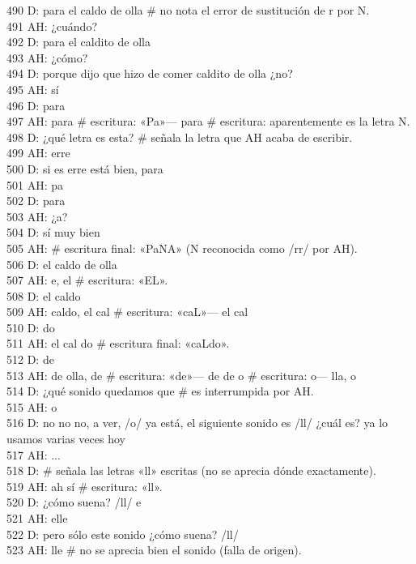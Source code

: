 490 D: para el caldo de olla \# no nota el error de sustitución de r por N.\\
491 AH: ¿cuándo?\\
492 D: para el caldito de olla\\
493 AH: ¿cómo?\\
494 D: porque dijo que hizo de comer caldito de olla ¿no?\\
495 AH: sí\\
496 D: para\\
497 AH: para \# escritura: «Pa»--- para \# escritura: aparentemente es la letra N.\\
498 D: ¿qué letra es esta? \# señala la letra que AH acaba de escribir.\\
499 AH: erre\\
500 D: si es erre está bien, para\\
501 AH: pa\\
502 D: para\\
503 AH: ¿a?\\
504 D: sí muy bien\\
505 AH: \# escritura final: «PaNA» (N reconocida como /rr/ por AH).\\
506 D: el caldo de olla\\
507 AH: e,  el \# escritura: «EL».\\
508 D: el caldo\\
509 AH: caldo, el cal \# escritura: «caL»--- el cal\\
510 D: do\\
511 AH: el cal do \# escritura final: «caLdo».\\
512 D: de\\
513 AH: de olla, de \# escritura: «de»--- de de o \#  escritura: o--- lla, o\\
514 D: ¿qué sonido quedamos que \# es interrumpida por AH.\\
515 AH: o\\
516 D: no no no, a ver, /o/ ya está, el siguiente sonido es /ll/ ¿cuál es? ya lo usamos varias veces hoy\\
517 AH: ...\\
518 D: \# señala las letras «ll» escritas (no se aprecia dónde exactamente).\\
519 AH: ah sí \# escritura: «ll».\\
520 D: ¿cómo suena? /ll/ e\\
521 AH: elle\\
522 D: pero sólo este sonido ¿cómo suena? /ll/\\
523 AH: lle \# no se aprecia bien el sonido (falla de origen).\\

